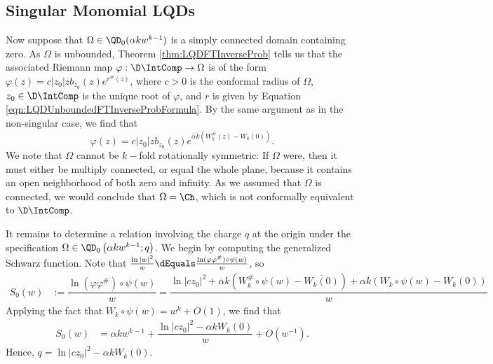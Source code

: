 \documentclass{article}
\numberwithin{equation}{section}
\begin{document}
\subsection{Singular Monomial LQDs}
Now suppose that $\Omega\in\QD_0(\alpha k w^{k-1})$ is a simply connected domain containing zero. As $\Omega$ is unbounded, Theorem \ref{thm:LQDFTInverseProb} tells us that the associated Riemann map $\varphi:\D\IntComp\rightarrow\Omega$ is of the form $\varphi(z)=c|z_0|zb_{z_0}(z)e^{r^{\#}(z)}$, where $c>0$ is the conformal radius of $\Omega$, $z_0\in\D\IntComp$ is the unique root of $\varphi$, and $r$ is given by Equation \ref{eqn:LQDUnboundedFTInverseProbFormula}. By the same argument as in the non-singular case, we find that
\begin{equation}\label{eqn:SingularMonomialLQD}
    \varphi(z)=c|z_0|zb_{z_0}(z)e^{\overline{\alpha}k\left(W_k^{\#}(z)-\overline{W_k(0)}\right)}.
\end{equation}
We note that $\Omega$ cannot be $k-$fold rotationally symmetric: If $\Omega$ were, then it must either be multiply connected, or equal the whole plane, because it contains an open neighborhood of both zero and infinity. As we assumed that $\Omega$ is connected, we would conclude that $\Omega=\Ch$, which is not conformally equivalent to $\D\IntComp$.

It remains to determine a relation involving the charge $q$ at the origin under the specification $\Omega\in\QD_0\left(\alpha k w^{k-1};q\right)$. We begin by computing the generalized Schwarz function. Note that $\frac{\ln|w|^2}{w}\dEquals \frac{\ln(\varphi\varphi^{\#})\circ\psi(w)}{w}$, so
\begin{align*}
    S_0(w)&:=\dfrac{\ln(\varphi\varphi^{\#})\circ\psi(w)}{w}=\dfrac{\ln|cz_0|^2+\overline{\alpha}k\left(W_k^{\#}\circ\psi(w)-\overline{W_k(0)}\right)+\alpha k\left(W_k\circ\psi(w)-W_k(0)\right)}{w}
\end{align*}
Applying the fact that $W_k\circ\psi(w)=w^k+O(1)$, we find that
\begin{align*}
S_0(w)&=\alpha kw^{k-1}+\dfrac{\ln|cz_0|^2-\alpha kW_k(0)}{w}+O(w^{-1}).
\end{align*}
Hence, $q=\ln|cz_0|^2-\alpha kW_k(0)$.\\
\end{document}
